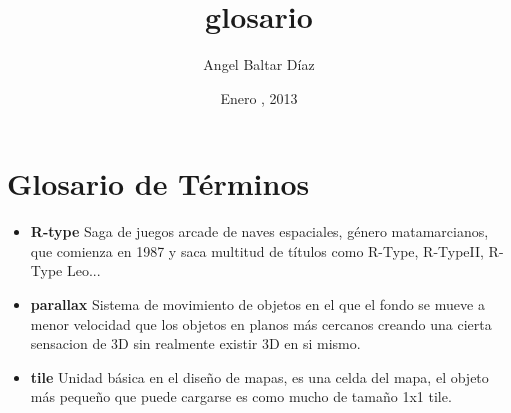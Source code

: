 


\title{glosario} 
\author{Angel Baltar Díaz}
\date{\Large Enero , 2013} 


\chapter{Glosario de Términos}
\label{glosario}

\begin{itemize}

\item \textbf{R-type} Saga de juegos arcade de naves espaciales, género matamarcianos, que comienza en 1987 y saca multitud de títulos como R-Type, R-TypeII, R-Type Leo...

\item \textbf{parallax} Sistema de movimiento de objetos en el que el fondo se mueve a menor velocidad que los objetos en planos más cercanos creando una cierta sensacion de 3D sin realmente existir 3D en si mismo.

\item \textbf{tile} Unidad básica en el diseño de mapas, es una celda del mapa, el objeto más pequeño que puede cargarse es como mucho de tamaño 1x1 tile.

\end{itemize}


%
